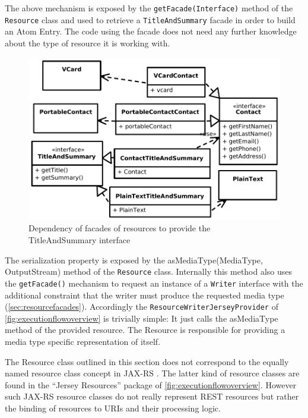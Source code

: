 \documentclass[11pt,a4paper,headsepline,twoside]{scrartcl}		%
\begin{document}
The above mechanism is exposed by the \lstinline:getFacade(Interface): method of
the \lstinline:Resource: class and used to retrieve a
\lstinline:TitleAndSummary: facade in order to build an Atom Entry. The code
using the facade does not need any further knowledge about the type of resource
it is working with.

\begin{figure}[htb]
  \centering
  \includegraphics[width=1\textwidth]{titleandsummary}

  \caption{Dependency of facades of resources to provide the TitleAndSummary interface}
  \label{fig:titleandsummary}
\end{figure}

The serialization property is exposed by the asMediaType(MediaType,
OutputStream) method of the \lstinline:Resource: class. Internally this method
also uses the \lstinline:getFacade(): mechanism to request an instance of a
\lstinline:Writer: interface with the additional constraint that the writer must
produce the requested media type (\autoref{sec:resourcefacades}). Accordingly the
\lstinline:ResourceWriterJerseyProvider: of \autoref{fig:executionflowoverview}
is trivially simple: It just calls the asMediaType method of the provided
resource. The Resource is responsible for providing a media type specific
representation of itself.

The Resource class outlined in this section does not correspond to the equally
named resource class concept in JAX-RS \cite{JAX-RS1.1}. The latter kind of
resource classes are found in the ``Jersey Resources'' package of
\autoref{fig:executionflowoverview}. However such JAX-RS resource classes do not
really represent REST resources but rather the binding of resources to URIs and
their processing logic.
\end{document}

